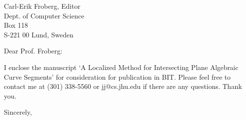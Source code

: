 \signature{John K. Johnstone}

\begin{letter}
{Carl-Erik Froberg, Editor\\
Dept. of Computer Science\\
Box 118\\
S-221 00 Lund, Sweden
}

\opening{Dear Prof. Froberg:}

I enclose the manuscript `A Localized Method for Intersecting
Plane Algebraic Curve Segments' for consideration for publication
in BIT.
Please feel free to contact me at (301) 338-5560  or jj@cs.jhu.edu
if there are any questions.
Thank you.

\closing{Sincerely,}
\end{letter}


